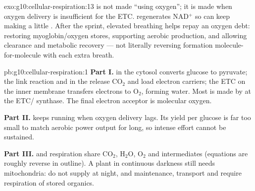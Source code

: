 \begin{solution}{exo:g10:cellular-respiration:13}
 is not made ``using oxygen''; it is made when oxygen delivery is
insufficient for the ETC.  regenerates NAD$^+$ so  can
keep making a little . After the sprint, elevated breathing helps repay an
oxygen debt: restoring myoglobin/oxygen stores, supporting aerobic 
production, and allowing  clearance and metabolic recovery --- not
literally reversing  formation molecule-for-molecule with each extra
breath.
\end{solution}

\begin{solution}{pb:g10:cellular-respiration:1}
\textbf{Part I.}  in the cytosol converts glucose to pyruvate; the
link reaction and  in the  release $\mathrm{CO_2}$ and load
electron carriers; the ETC on the inner membrane transfers electrons to
$\mathrm{O_2}$, forming water. Most  is made by 
at the ETC/ synthase. The final electron acceptor is molecular oxygen.

\textbf{Part II.}   keeps  running when oxygen
delivery lags. Its  yield per glucose is far too small to match aerobic
power output for long, so intense  effort cannot be sustained.

\textbf{Part III.}  and respiration share $\mathrm{CO_2}$,
$\mathrm{H_2O}$, $\mathrm{O_2}$ and  intermediates (equations are
roughly reverse in outline). A plant in continuous darkness still needs
mitochondria:  do not supply  at night, and maintenance,
transport and  require respiration of stored organics.
\end{solution}
